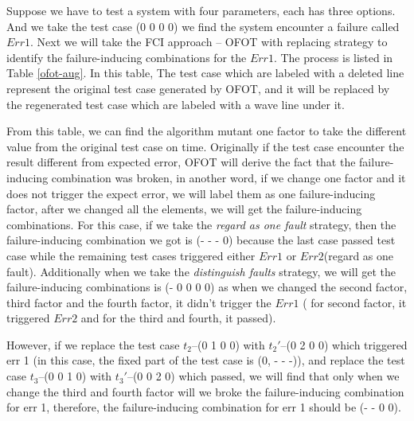 \documentclass{sig-alternate}
\begin{document}
Suppose we have to test a system with four parameters, each has three options. And we take the test case (0 0 0 0) we find the system encounter a failure called $Err 1$. Next we will take the FCI approach -- OFOT with replacing strategy to identify the failure-inducing combinations for the $Err 1$. The process is listed in Table \ref{ofot-aug}. In this table, The test case which are labeled with a deleted line represent the original test case generated by OFOT, and it will be replaced by the regenerated test case which are labeled with a wave line under it.

From this table, we can find the algorithm mutant one factor to take the different value from the original test case on time. Originally if the test case encounter the result different from expected error, OFOT will derive the fact that the failure-inducing combination was broken, in another word, if we change one factor and it does not trigger the expect error, we will label them as one failure-inducing factor, after we changed all the elements, we will get the failure-inducing combinations. For this case, if we take the \emph{regard as one fault} strategy, then the failure-inducing combination we got is (- - - 0) because the last case passed test case while the remaining test cases triggered either $Err 1$ or $Err 2$(regard as one fault).  Additionally when we take the \emph{distinguish faults} strategy, we will get the failure-inducing combinations is (- 0 0 0 0) as when we changed the second factor, third factor and the fourth factor, it didn't trigger the $Err 1$ ( for second factor, it triggered $Err 2$ and for the third and fourth, it passed).


However, if we replace the test case $t_{2}$--(0 1 0 0) with $t_{2}'$--(0 2 0 0) which triggered err 1 (in this case, the fixed part of the test case is (0, - - -)), and replace the test case $t_{3}$--(0 0 1 0) with $t_{3}'$--(0 0 2 0) which passed, we will find that only when we change the third and fourth factor will we broke the failure-inducing combination for err 1, therefore,  the failure-inducing combination for err 1 should be (- - 0 0).
\end{document}

